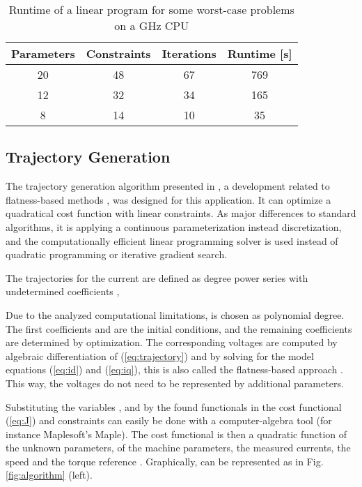 \documentclass[a4paper,11pt,fleqn]{article}
\begin{document}
\begin{table}[!htb]
\renewcommand{\arraystretch}{1.0}
\caption{Runtime of a linear program for some worst-case problems on a  GHz CPU}
\label{tbl:computer}
\centering
\begin{tabular}{|c|c|c|c|}
\hline
Parameters   &  Constraints & Iterations &  Runtime [s] \\
\hline
  20         &   48         &   67       &   769  \\
\hline
  12         &   32         &   34       &   165  \\
\hline
  8          &   14         &   10       &   35  \\
\hline
\end{tabular}
\end{table}



\subsection*{Trajectory Generation}

The trajectory generation algorithm presented in \cite{SK10}, a development related to flatness-based methods \cite{Guay}, was designed for this application. It can optimize a quadratical cost function with linear constraints. As major differences to standard algorithms, it is applying a continuous parameterization instead discretization, and the computationally efficient linear programming solver is used instead of quadratic programming or iterative gradient search.

The trajectories for the current are defined as degree  power series with undetermined coefficients ,

Due to the analyzed computational limitations,  is chosen as polynomial degree. The first coefficients  and  are the initial conditions, and the remaining  coefficients are determined by optimization. The corresponding voltages  are computed by algebraic differentiation of (\ref{eq:trajectory}) and by solving for the model equations (\ref{eq:id}) and (\ref{eq:iq}), this is also called the flatness-based approach \cite{HSR04}. This way, the voltages do not need to be represented by additional parameters.

Substituting the variables ,  and  by the found functionals in the cost functional  (\ref{eq:J}) and constraints can easily be done with a computer-algebra tool (for instance Maplesoft's Maple). The cost functional  is then a quadratic function of the unknown parameters, of the machine parameters, the measured currents, the speed  and the torque reference . Graphically,  can be represented as in Fig. \ref{fig:algorithm} (left).
\end{document}
